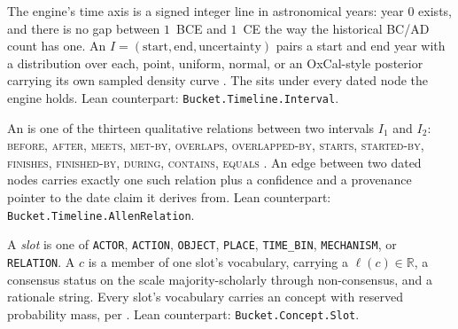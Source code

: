 \documentclass[11pt]{article}
\begin{document}
\begin{definition}
\label{def:interval}
The engine's time axis is a signed integer line in astronomical years:
year $0$ exists, and there is no gap between $1$~BCE and $1$~CE the way
the historical BC/AD count has one. An  $I = (\mathrm{start}, \mathrm{end}, \mathrm{uncertainty})$ pairs
a start and end year with a distribution over each, point, uniform,
normal, or an OxCal-style posterior carrying its own sampled density
curve \autocite{bronkramsey2009bayesian}. The  sits under every dated node the engine holds.
Lean counterpart: \texttt{Bucket.Timeline.Interval}.
\end{definition}

\begin{definition}
\label{def:allen}
An  is one of the thirteen
qualitative relations between two intervals $I_1$ and $I_2$:
\textsc{before}, \textsc{after}, \textsc{meets}, \textsc{met-by},
\textsc{overlaps}, \textsc{overlapped-by}, \textsc{starts}, \textsc{
started-by}, \textsc{finishes}, \textsc{finished-by}, \textsc{during},
\textsc{contains}, \textsc{equals} \autocite{allen1983interval}. An edge
between two dated nodes carries exactly one such relation plus a
confidence and a provenance pointer to the date claim it derives from.
Lean counterpart: \texttt{Bucket.Timeline.AllenRelation}.
\end{definition}

\begin{definition}
\label{def:slot}
A \emph{slot} is one of \texttt{ACTOR}, \texttt{ACTION}, \texttt{OBJECT},
\texttt{PLACE}, \texttt{TIME\_BIN}, \texttt{MECHANISM}, or
\texttt{RELATION}. A  $c$ is a member of one
slot's vocabulary, carrying a 
$\ell(c) \in \mathbb{R}$, a consensus status on the scale
majority-scholarly through non-consensus, and a rationale string. Every
slot's vocabulary carries an  concept
with reserved probability mass, per . Lean
counterpart: \texttt{Bucket.Concept.Slot}.
\end{definition}
\end{document}
